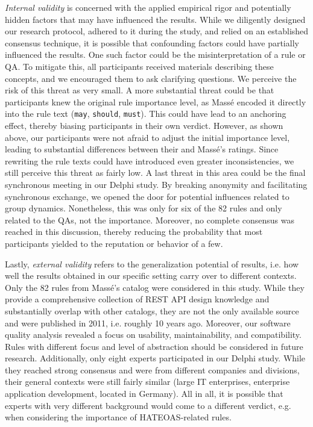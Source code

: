 \documentclass[runningheads]{llncs}
\begin{document}
\textit{Internal validity} is concerned with the applied empirical rigor and potentially hidden factors that may have influenced the results.
While we diligently designed our research protocol, adhered to it during the study, and relied on an established consensus technique, it is possible that confounding factors could have partially influenced the results.
One such factor could be the misinterpretation of a rule or QA.
To mitigate this, all participants received materials describing these concepts, and we encouraged them to ask clarifying questions.
We perceive the risk of this threat as very small.
A more substantial threat could be that participants knew the original rule importance level, as Massé encoded it directly into the rule text (\texttt{may}, \texttt{should}, \texttt{must}).
This could have lead to an anchoring effect, thereby biasing participants in their own verdict.
However, as shown above, our participants were not afraid to adjust the initial importance level, leading to substantial differences between their and Massé's ratings.
Since rewriting the rule texts could have introduced even greater inconsistencies, we still perceive this threat as fairly low.
A last threat in this area could be the final synchronous meeting in our Delphi study.
By breaking anonymity and facilitating synchronous exchange, we opened the door for potential influences related to group dynamics.
Nonetheless, this was only for six of the 82 rules and only related to the QAs, not the importance.
Moreover, no complete consensus was reached in this discussion, thereby reducing the probability that most participants yielded to the reputation or behavior of a few.

Lastly, \textit{external validity} refers to the generalization potential of results, i.e. how well the results obtained in our specific setting carry over to different contexts.
Only the 82 rules from Massé's catalog were considered in this study.
While they provide a comprehensive collection of REST API design knowledge and substantially overlap with other catalogs, they are not the only available source and were published in 2011, i.e. roughly 10 years ago.
Moreover, our software quality analysis revealed a focus on usability, maintainability, and compatibility.
Rules with different focus and level of abstraction should be considered in future research.
Additionally, only eight experts participated in our Delphi study.
While they reached strong consensus and were from different companies and divisions, their general contexts were still fairly similar (large IT enterprises, enterprise application development, located in Germany).
All in all, it is possible that experts with very different background would come to a different verdict, e.g. when considering the importance of HATEOAS-related rules.
\end{document}
